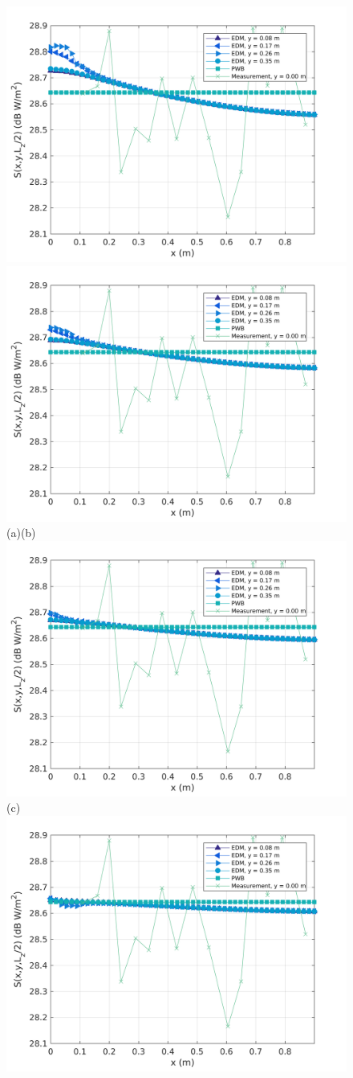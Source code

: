 \documentclass[a4paper]{article}
\numberwithin{equation}{section}
\begin{document}
\begin{figure}[ht]
\begin{center}
\includegraphics[width=0.49\linewidth]{figures/SDM_3D_SU_PowerDensityProfileXMeas_JX_k0_5}
\includegraphics[width=0.49\linewidth]{figures/SDM_3D_SU_PowerDensityProfileXMeas_JX_k0_75}\\
{\footnotesize (a)\hspace{75mm}(b)}\\
\includegraphics[width=0.5\linewidth]{figures/SDM_3D_SU_PowerDensityProfileXMeas_JX_k1_0}\\
{\footnotesize (c)}\\
\includegraphics[width=0.49\linewidth]{figures/SDM_3D_SU_PowerDensityProfileXMeas_JX_k1_5}

\end{center}
\end{figure}
\end{document}

